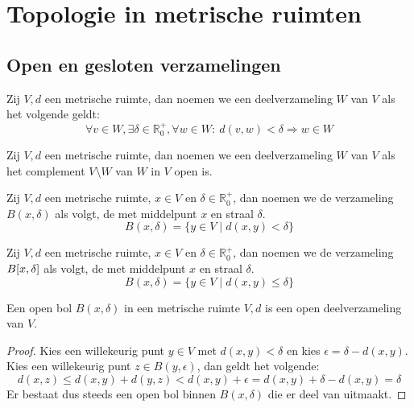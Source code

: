 \documentclass[main.tex]{subfiles}
\begin{document}
\chapter{Topologie in metrische ruimten}
\label{cha:topologie-in-metrische-ruimten}

\section{Open en gesloten verzamelingen}
\label{sec:open-en-gesloten}

\begin{de}
  Zij $V,d$ een metrische ruimte, dan noemen we een deelverzameling $W$ van $V$  als het volgende geldt:
  \[ \forall v\in W, \exists \delta \in \mathbb{R}_{0}^{+}, \forall w\in W:\ d(v,w) < \delta \Rightarrow w \in W \]
\end{de}

\begin{de}
  Zij $V,d$ een metrische ruimte, dan noemen we een deelverzameling $W$ van $V$  als het complement $V\setminus W$ van $W$ in $V$ open is.
\end{de}

\begin{de}
  Zij $V,d$ een metrische ruimte, $x\in V$ en $\delta \in \mathbb{R}_{0}^{+}$, dan noemen we de verzameling $B(x,\delta)$ als volgt, de  met middelpunt $x$ en straal $\delta$.
  \[ B(x,\delta) = \{ y\in V \mid d(x,y) < \delta \} \]
\end{de}

\begin{de}
  Zij $V,d$ een metrische ruimte, $x\in V$ en $\delta \in \mathbb{R}_{0}^{+}$, dan noemen we de verzameling $B\interval{x}{\delta}$ als volgt, de  met middelpunt $x$ en straal $\delta$.
  \[ B(x,\delta) = \{ y\in V \mid d(x,y) \le \delta \} \]
\end{de}

\begin{st}
  Een open bol $B(x,\delta)$ in een metrische ruimte $V,d$ is een open deelverzameling van $V$.

  \begin{proof}
    Kies een willekeurig punt $y\in V$ met $d(x,y) < \delta$ en kies $\epsilon = \delta - d(x,y)$.
    Kies een willekeurig punt $z\in B(y,\epsilon)$, dan geldt het volgende:
    \[ d(x,z) \le d(x,y) + d(y,z) < d(x,y) + \epsilon = d(x,y) + \delta - d(x,y) = \delta \]
    Er bestaat dus steeds een open bol binnen $B(x,\delta)$ die er deel van uitmaakt.
  \end{proof}
\end{st}
\end{document}

